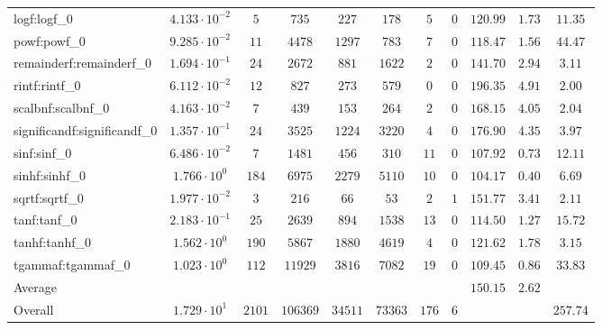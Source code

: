 \begin{tabular}{|l|c|c|c|c|c|c|c|c|c|c|}
logf:logf\_0                 & $ 4.133 \cdot 10^{-2} $ & $ 5      $ & $ 735    $ & $ 227   $ & $ 178   $ & $ 5   $ & $ 0 $ & $ 120.99      $ & $ 1.73    $ & $ 11.35   $ \\
powf:powf\_0                 & $ 9.285 \cdot 10^{-2} $ & $ 11     $ & $ 4478   $ & $ 1297  $ & $ 783   $ & $ 7   $ & $ 0 $ & $ 118.47      $ & $ 1.56    $ & $ 44.47   $ \\
remainderf:remainderf\_0     & $ 1.694 \cdot 10^{-1} $ & $ 24     $ & $ 2672   $ & $ 881   $ & $ 1622  $ & $ 2   $ & $ 0 $ & $ 141.70      $ & $ 2.94    $ & $ 3.11    $ \\
rintf:rintf\_0               & $ 6.112 \cdot 10^{-2} $ & $ 12     $ & $ 827    $ & $ 273   $ & $ 579   $ & $ 0   $ & $ 0 $ & $ 196.35      $ & $ 4.91    $ & $ 2.00    $ \\
scalbnf:scalbnf\_0           & $ 4.163 \cdot 10^{-2} $ & $ 7      $ & $ 439    $ & $ 153   $ & $ 264   $ & $ 2   $ & $ 0 $ & $ 168.15      $ & $ 4.05    $ & $ 2.04    $ \\
significandf:significandf\_0 & $ 1.357 \cdot 10^{-1} $ & $ 24     $ & $ 3525   $ & $ 1224  $ & $ 3220  $ & $ 4   $ & $ 0 $ & $ 176.90      $ & $ 4.35    $ & $ 3.97    $ \\
sinf:sinf\_0                 & $ 6.486 \cdot 10^{-2} $ & $ 7      $ & $ 1481   $ & $ 456   $ & $ 310   $ & $ 11  $ & $ 0 $ & $ 107.92      $ & $ 0.73    $ & $ 12.11   $ \\
sinhf:sinhf\_0               & $ 1.766 \cdot 10^{0}  $ & $ 184    $ & $ 6975   $ & $ 2279  $ & $ 5110  $ & $ 10  $ & $ 0 $ & $ 104.17      $ & $ 0.40    $ & $ 6.69    $ \\
sqrtf:sqrtf\_0               & $ 1.977 \cdot 10^{-2} $ & $ 3      $ & $ 216    $ & $ 66    $ & $ 53    $ & $ 2   $ & $ 1 $ & $ 151.77      $ & $ 3.41    $ & $ 2.11    $ \\
tanf:tanf\_0                 & $ 2.183 \cdot 10^{-1} $ & $ 25     $ & $ 2639   $ & $ 894   $ & $ 1538  $ & $ 13  $ & $ 0 $ & $ 114.50      $ & $ 1.27    $ & $ 15.72   $ \\
tanhf:tanhf\_0               & $ 1.562 \cdot 10^{0}  $ & $ 190    $ & $ 5867   $ & $ 1880  $ & $ 4619  $ & $ 4   $ & $ 0 $ & $ 121.62      $ & $ 1.78    $ & $ 3.15    $ \\
tgammaf:tgammaf\_0           & $ 1.023 \cdot 10^{0}  $ & $ 112    $ & $ 11929  $ & $ 3816  $ & $ 7082  $ & $ 19  $ & $ 0 $ & $ 109.45      $ & $ 0.86    $ & $ 33.83   $ \\
\hline
Average                      & $                     $ & $        $ & $        $ & $       $ & $       $ & $     $ & $   $ & $ 150.15      $ & $ 2.62    $ & $         $ \\
\hline
Overall                      & $ 1.729 \cdot 10^{1}  $ & $ 2101   $ & $ 106369 $ & $ 34511 $ & $ 73363 $ & $ 176 $ & $ 6 $ & $             $ & $         $ & $ 257.74  $ \\
\hline
\end{tabular}
